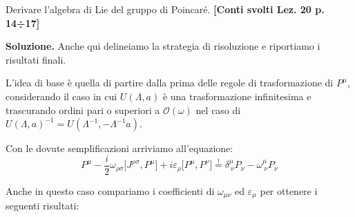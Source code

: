 \documentclass[../main.tex]{subfiles}
\begin{document}
\begin{exercise}
    Derivare l'algebra di Lie del gruppo di Poincaré. \textbf{[Conti svolti Lez. 20 p. 14÷17]}

    \textbf{Soluzione. } Anche qui delineiamo la strategia di risoluzione e riportiamo i risultati finali. 

    L'idea di base è quella di partire dalla prima delle regole di trasformazione di \(P^\mu\), considerando il caso in cui $U(\Lambda, a)$ è una trasformazione infinitesima e trascurando ordini pari o superiori a \(\mathscr O(\omega)\) nel caso di $U(\Lambda, a)^{-1} = U(\Lambda^{-1}, -\Lambda^{-1}a)$.

    Con le dovute semplificazioni arriviamo all'equazione:
    \[
    P^\mu -\frac{i}{2}\omega_{\rho\sigma} \big[ J^{\rho\sigma}, P^\mu \big] + i\varepsilon_\rho \big[P^\mu, P^\nu\big] \overset{!}{=} \delta^\mu_{~\nu}P_\nu -\omega^\mu_{~\nu}P_\nu
    \]

    Anche in questo caso compariamo i coefficienti di \(\omega_{\mu\nu}\) ed \(\varepsilon_{\mu}\) per ottenere i seguenti risultati:


\end{exercise}
\end{document}
